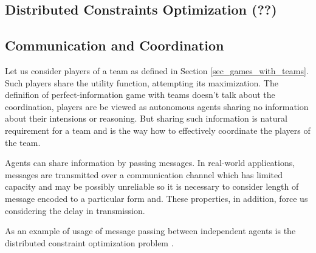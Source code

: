 \subsection{Distributed Constraints Optimization (??)}



\subsection{Communication and Coordination}

Let us consider players of a team as defined in Section \ref{sec_games_with_teams}. Such
players share the utility function, attempting its maximization. The definifion of
perfect-information game with teams doesn't talk about the coordination, players are be viewed
as autonomous agents sharing no information about their intensions or reasoning. But sharing
such information is natural requirement for a team and is the way how to effectively coordinate
the players of the team.

Agents can share information by passing messages. In real-world applications, messages are
transmitted over a communication channel which has limited capacity and may be possibly
unreliable so it is necessary to consider length of message encoded to a particular form and.
These properties, in addition, force us considering the delay in transmission.

As an example of usage of message passing between independent agents is the distributed
constraint optimization problem \cite{Zivan2009}.
